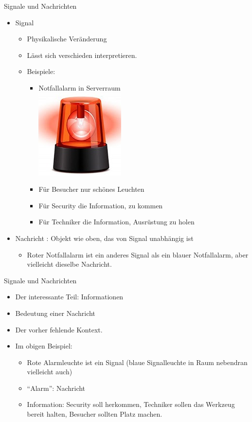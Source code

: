 \documentclass{beamer}
\begin{document}
\begin{frame}{Signale und Nachrichten}	
	\begin{itemize}
		 \item Signal
		\begin{itemize}
			 \item Physikalische Veränderung
			 \item Lässt sich verschieden interpretieren.
			 \item Beispiele:
			\begin{itemize}
				 \item Notfallalarm in Serverraum\\
				\includegraphics[width=.1\linewidth]{../images/alarm.jpg}\\
				 \item Für Besucher nur schönes Leuchten
				 \item Für Security die Information, zu kommen
				 \item Für Techniker die Information, Ausrüstung zu holen
			\end{itemize}
		\end{itemize}
		
		 \item Nachricht  : Objekt wie oben, das von Signal unabhängig ist
		\begin{itemize}
			 \item Roter Notfallalarm ist ein anderes Signal als ein blauer Notfallalarm, aber vielleicht dieselbe Nachricht.
		\end{itemize}
	\end{itemize}
\end{frame}

\begin{frame}{Signale und Nachrichten}
	\begin{itemize}
		 \item Der interessante Teil: Informationen
		 \item Bedeutung einer Nachricht
		 \item Der vorher fehlende Kontext.
		 \item Im obigen Beispiel:
		\begin{itemize}
			 \item Rote Alarmleuchte ist ein Signal (blaue Signalleuchte in Raum nebendran vielleicht auch)
			 \item ``Alarm'': Nachricht
			 \item Information: Security soll herkommen, Techniker sollen das Werkzeug bereit halten, Besucher sollten Platz machen.
		\end{itemize}
	\end{itemize}
\end{frame}
\end{document}
